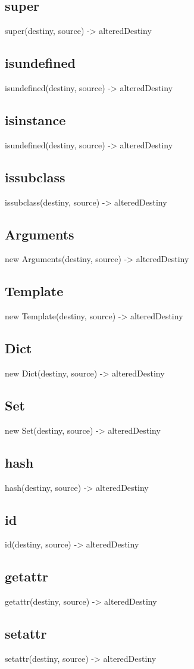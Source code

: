 {{{{{{{{\subsection*{super}
super(destiny, source) -> alteredDestiny
\subsection*{isundefined}
isundefined(destiny, source) -> alteredDestiny
\subsection*{isinstance}
isundefined(destiny, source) -> alteredDestiny
\subsection*{issubclass}
issubclass(destiny, source) -> alteredDestiny
\subsection*{Arguments}
new Arguments(destiny, source) -> alteredDestiny
\subsection*{Template}
new Template(destiny, source) -> alteredDestiny
\subsection*{Dict}
new Dict(destiny, source) -> alteredDestiny
\subsection*{Set}
new Set(destiny, source) -> alteredDestiny
\subsection*{hash}
hash(destiny, source) -> alteredDestiny
\subsection*{id}
id(destiny, source) -> alteredDestiny
\subsection*{getattr}
getattr(destiny, source) -> alteredDestiny
\subsection*{setattr}
setattr(destiny, source) -> alteredDestiny
}}}}}}}}
